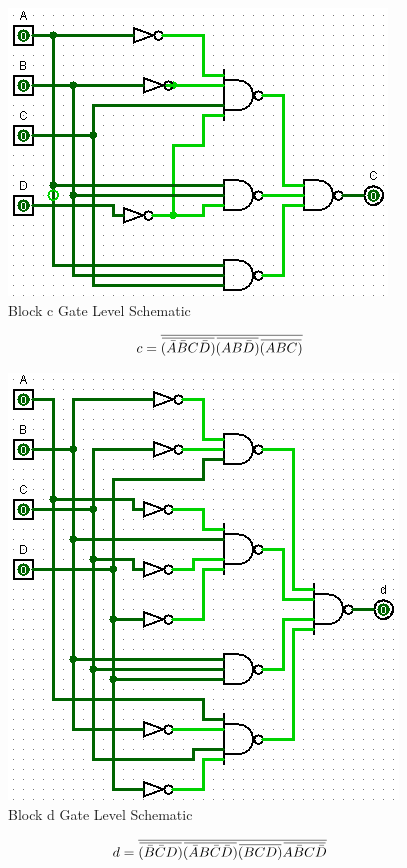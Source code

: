 \documentclass[12pt]{article}
\newcommand{\overbar}[1]{\mkern 1.5mu\overline{\mkern-1.5mu#1\mkern-1.5mu}\mkern 1.5mu} %
\begin{document}
\begin{figure}[h]
	\centering
	\label{fig:cBlockGates}
	\includegraphics[width=0.65\linewidth, keepaspectratio]{c_logicCkt}
	\caption{Block c Gate Level Schematic}
\end{figure}

\begin{equation}
	c = \overline{\overbar{(\bar{A}\bar{B}C\bar{D})}\overbar{(AB\bar{D})}\overbar{(ABC)}}
\end{equation}

\begin{figure}[h]
	\centering
	\label{fig:dBlockGates}
	\includegraphics[width=0.65\linewidth, keepaspectratio]{d_logicCkt}
	\caption{Block d Gate Level Schematic}
\end{figure}

\begin{equation}
	d = \overline{\overbar{(\bar{B}\bar{C}D)}\overbar{(\bar{A}B\bar{C}\bar{D})}\overbar{(BCD)}\overbar{A\bar{B}C\bar{D}}}
\end{equation}
\end{document}
